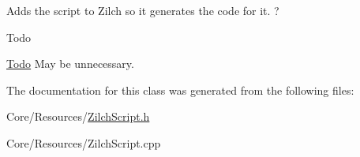 Adds the script to Zilch so it generates the code for it. ? 

\begin{DoxyRefDesc}{Todo}
\item[\hyperlink{todo__todo000014}{Todo}]May be unnecessary. \end{DoxyRefDesc}


The documentation for this class was generated from the following files\-:\begin{DoxyCompactItemize}
\item 
Core/\-Resources/\hyperlink{ZilchScript_8h}{Zilch\-Script.\-h}\item 
Core/\-Resources/Zilch\-Script.\-cpp\end{DoxyCompactItemize}
